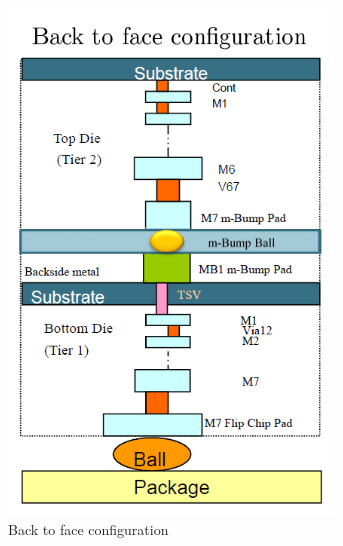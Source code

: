 \begin{figure}[h!]
\begin{subfigure}{0.5\textwidth}
	\begin{center}
	\includegraphics[width=0.95\textwidth]{backtoface}
	\caption{Back to face configuration}
	\label{fig:backtoface}
	\end{center}
\end{subfigure}
\begin{subfigure}{0.5\textwidth}
	\begin{center}

\end{center}
\end{subfigure}
\end{figure}
